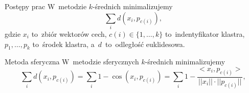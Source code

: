\documentclass[11pt,pdftex,mathserif]{beamer}\usepackage[]{graphicx}\usepackage[]{color}
\theoremstyle{definition}
\begin{document}
\begin{frame}{Postępy prac}
W~metodzie $k$-średnich minimalizujemy
$$
\sum_i d(x_i, p_{c(i)}),
$$
gdzie $x_i$ to~zbiór wektorów cech, $c(i) \in \{1,\ldots,k\}$ to~indentyfikator klastra, $p_1,\ldots,p_k$ to~środek klastra, a~$d$~to~odległość euklidesowa.
\begin{block}{Metoda sferyczna}
W~metodzie sferycznych $k$-średnich minimalizujemy \cite{Hornik2012:sphkmeans, Wild2002:sphkmeans}
$$
\sum_i d(x_i, p_{c(i)}) = \sum_i 1-\cos(x_i, p_{c(i)}) = \sum_i 1-\frac{<x_i, p_{c(i)}>}{||x_i||\cdot ||p_{c(i)}||},
$$
\end{block}
\end{frame}

% 
\end{document}
